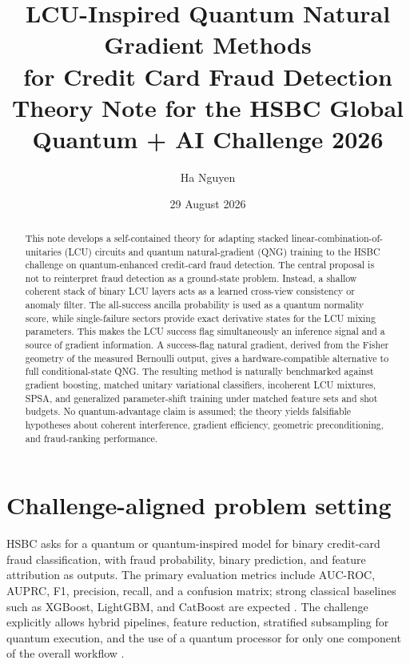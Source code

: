 \documentclass[11pt,a4paper]{article}
\title{\textbf{LCU-Inspired Quantum Natural Gradient Methods\\for Credit Card Fraud Detection}\\[0.5em]
\large Theory Note for the HSBC Global Quantum + AI Challenge 2026}
\author{Ha Nguyen}
\date{29 August 2026}
\begin{document}
\maketitle

\begin{abstract}
This note develops a self-contained theory for adapting stacked linear-combination-of-unitaries (LCU) circuits and quantum natural-gradient (QNG) training to the HSBC challenge on quantum-enhanced credit-card fraud detection. The central proposal is not to reinterpret fraud detection as a ground-state problem. Instead, a shallow coherent stack of binary LCU layers acts as a learned cross-view consistency or anomaly filter. The all-success ancilla probability is used as a quantum normality score, while single-failure sectors provide exact derivative states for the LCU mixing parameters. This makes the LCU success flag simultaneously an inference signal and a source of gradient information. A success-flag natural gradient, derived from the Fisher geometry of the measured Bernoulli output, gives a hardware-compatible alternative to full conditional-state QNG. The resulting method is naturally benchmarked against gradient boosting, matched unitary variational classifiers, incoherent LCU mixtures, SPSA, and generalized parameter-shift training under matched feature sets and shot budgets. No quantum-advantage claim is assumed; the theory yields falsifiable hypotheses about coherent interference, gradient efficiency, geometric preconditioning, and fraud-ranking performance.
\end{abstract}

\tableofcontents
\clearpage

\section{Challenge-aligned problem setting}

HSBC asks for a quantum or quantum-inspired model for binary credit-card fraud classification, with fraud probability, binary prediction, and feature attribution as outputs. The primary evaluation metrics include AUC-ROC, AUPRC, F1, precision, recall, and a confusion matrix; strong classical baselines such as XGBoost, LightGBM, and CatBoost are expected \cite{HSBC2026}. The challenge explicitly allows hybrid pipelines, feature reduction, stratified subsampling for quantum execution, and the use of a quantum processor for only one component of the overall workflow \cite{HSBC2026}.
\end{document}
